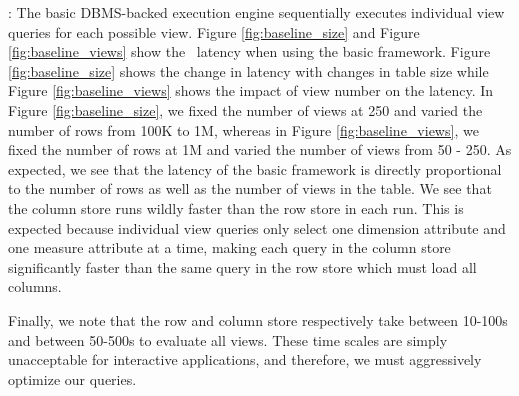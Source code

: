 : The basic DBMS-backed execution engine
sequentially executes individual view queries for each possible view.
Figure \ref{fig:baseline_size} and Figure \ref{fig:baseline_views} show the
\VizRecDB\ latency when using the basic framework.
Figure \ref{fig:baseline_size} shows the change in latency with changes in table
size while Figure \ref{fig:baseline_views} shows the impact of view number on
the latency.
In Figure \ref{fig:baseline_size}, we fixed the number of views at 250 and
varied the number of rows from 100K to 1M, whereas in Figure
\ref{fig:baseline_views}, we fixed the number of rows at 1M and varied the
number of views from 50 - 250.
As expected, we see that the latency of the basic framework is directly
proportional to the number of rows as well as the number of views in the table.
We see that the column store runs wildly faster than the row store in each run.
This is expected because individual view queries only select one dimension
attribute and one measure attribute at a time, making each query in the column
store significantly faster than the same query in the row store which must load
all columns.

Finally, we note that the row and column store respectively take between 10-100s
and between 50-500s to evaluate all views.
These time scales are simply unacceptable for interactive applications, and
therefore, we must aggressively optimize our queries. \\


